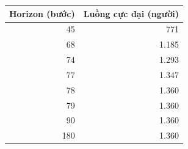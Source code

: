 \small\begin{tabular}{rr}
\toprule
Horizon (bước) & Luồng cực đại (người)\\\midrule
45 & 771\\
68 & 1.185\\
74 & 1.293\\
77 & 1.347\\
78 & 1.360\\
79 & 1.360\\
90 & 1.360\\
180 & 1.360\\
\bottomrule\end{tabular}
